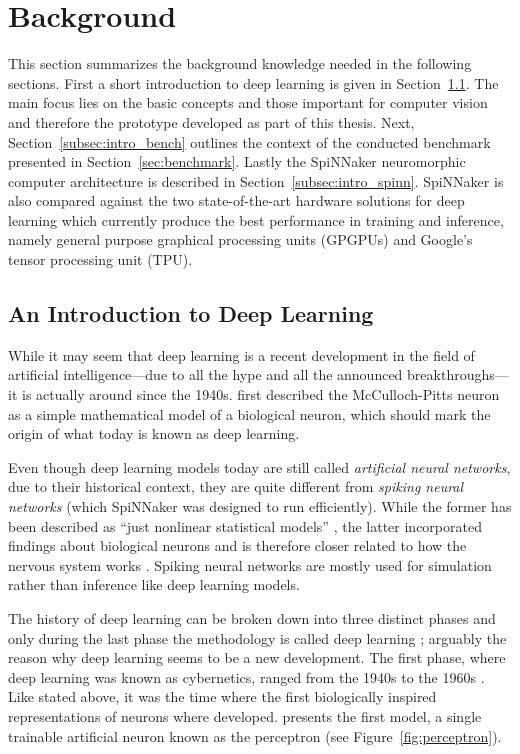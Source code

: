 \documentclass[]{article}
\begin{document}
\section{Background} %
\label{sec:background}

This section summarizes the background knowledge needed in the
following sections.
First a short introduction to deep learning is given in
Section~\ref{subsec:intro_dl}.
The main focus lies on the basic concepts and those important for
computer vision and therefore the prototype developed as part of this
thesis.
Next, Section~\ref{subsec:intro_bench} outlines the context of the
conducted benchmark presented in Section~\ref{sec:benchmark}.
Lastly the SpiNNaker neuromorphic computer architecture is described
in Section~\ref{subsec:intro_spinn}.
SpiNNaker is also compared against the two state-of-the-art hardware
solutions for deep learning which currently produce the best
performance in training and inference, namely general purpose
graphical processing units (GPGPUs) and Google's tensor processing
unit (TPU).

\subsection{An Introduction to Deep Learning} %
\label{subsec:intro_dl}

While it may seem that deep learning is a recent development in the
field of artificial intelligence---due to all the hype and all
the announced breakthroughs---it is actually around since the 1940s.
\citet{mcculloch_et_al_1943} first described the McCulloch-Pitts
neuron as a simple mathematical model of a biological neuron, which
should mark the origin of what today is known as deep learning.

Even though deep learning models today are still called
\textit{artificial neural networks}, due to their historical context,
they are quite different from \textit{spiking neural networks}
(which SpiNNaker was designed to run efficiently).
While the former has been described as ``just nonlinear statistical
models'' \citep{hastie_et_al_2009}, the latter incorporated findings
about biological neurons and is therefore closer related to how the
nervous system works \citep{maass1997}.
Spiking neural networks are mostly used for simulation rather than
inference like deep learning models.

The history of deep learning can be broken down into three distinct
phases and only during the last phase the methodology is
called deep learning \citep{goodfellow_et_al_2016};
arguably the reason why deep learning seems to be a new development.
The first phase, where deep learning was known as cybernetics, ranged
from the 1940s to the 1960s \citep{goodfellow_et_al_2016}.
Like stated above, it was the time where the first biologically
inspired representations of neurons where developed.
\citet{rosenblatt_1958} presents the first model, a single trainable
artificial neuron known as the perceptron (see
Figure~\ref{fig:perceptron}).
\end{document}
